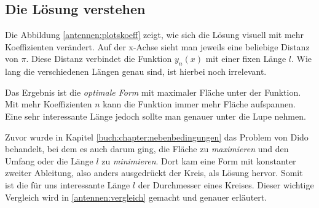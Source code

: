 \subsection{Die Lösung verstehen\label{antennen:auswertung}}

Die Abbildung \ref{antennen:plotskoeff} zeigt, wie sich die Lösung visuell mit mehr 
Koeffizienten verändert. Auf der x-Achse sieht man jeweils eine beliebige Distanz von \emph{$\pi$}.
Diese Distanz verbindet die Funktion $y_n(x)$ mit einer
fixen Länge $l$. Wie lang die verschiedenen Längen genau sind, ist hierbei noch irrelevant.

Das Ergebnis ist die \emph{optimale Form} mit
maximaler Fläche unter der Funktion. Mit mehr Koeffizienten $n$ kann die Funktion
immer mehr Fläche aufspannen. Eine sehr interessante Länge jedoch sollte man
genauer unter die Lupe nehmen. 

Zuvor wurde in Kapitel \ref{buch:chapter:nebenbedingungen} das Problem von Dido
behandelt, bei dem es auch darum ging, die Fläche zu \emph{maximieren} und den Umfang oder die Länge $l$ zu 
\emph{minimieren}. 
Dort kam eine Form mit konstanter zweiter Ableitung, also anders ausgedrückt
der Kreis, als Lösung hervor. Somit ist die für uns interessante Länge $l$ der Durchmesser eines Kreises. Dieser wichtige Vergleich wird in \ref{antennen:vergleich} gemacht und genauer erläutert.

